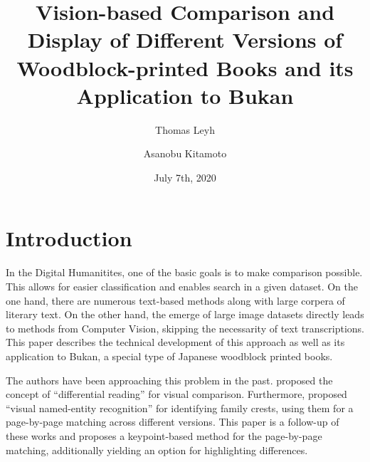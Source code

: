 \documentclass{ltjarticle}
\title{Vision-based Comparison and Display of Different Versions of Woodblock-printed Books and its Application to Bukan}
\author[1,3]{Thomas Leyh}
\author[2,3]{Asanobu Kitamoto}
\affil[1]{University of Freiburg}
\affil[2]{ROIS-DS Center for Open Data in the Humanities}
\affil[3]{National Institute of Informatics}
\date{July 7th, 2020}
\begin{document}
\maketitle

\section{Introduction}

In the Digital Humanitites, one of the basic goals is to make comparison possible. This allows for easier classification and enables search in a given dataset. On the one hand, there are numerous text-based methods along with large corpera of literary text. On the other hand, the emerge of large image datasets directly leads to methods from Computer Vision, skipping the necessarity of text transcriptions. This paper describes the technical development of this approach as well as its application to Bukan, a special type of Japanese woodblock printed books.

The authors have been approaching this problem in the past. \cite{kitamoto2018} proposed the concept of “differential reading” for visual comparison. Furthermore, \cite{hakim2019} proposed “visual named-entity recognition” for identifying family crests, using them for a page-by-page matching across different versions. This paper is a follow-up of these works and proposes a keypoint-based method for the page-by-page matching, additionally yielding an option for highlighting differences. 


\end{document}

